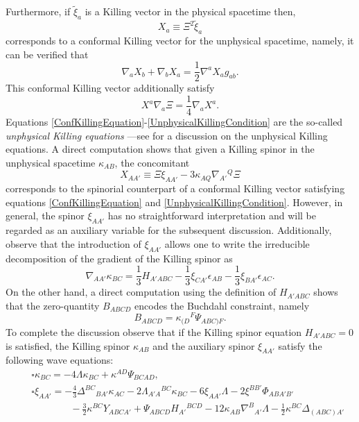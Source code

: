 \documentclass[10pt,a4paper]{article}
\theoremstyle{plain}
\begin{document}
Furthermore, if $\tilde{\xi}_{a}$ is a Killing 
vector in the physical spacetime
  then, 
\begin{equation}
X_{a} \equiv \Xi^2\tilde{\xi}_{a}
\end{equation}
corresponds to a conformal Killing vector for the unphysical
spacetime, namely, it can be verified that
\begin{equation}\label{ConfKillingEquation}
\nabla_{a}X_{b}+ \nabla_{b}X_{a}=\frac{1}{2}\nabla^{a}X_{a}g_{ab}.
\end{equation}
This conformal Killing vector additionally satisfy
\begin{equation}
\label{UnphysicalKillingCondition}
X^{a}\nabla_{a}\Xi=\frac{1}{4}\nabla_{a}X^{a}.
\end{equation}
Equations
\eqref{ConfKillingEquation}-\eqref{UnphysicalKillingCondition} are the
so-called \emph{unphysical Killing equations} ---see \cite{Pae14} for
a discussion on the unphysical Killing equations.  A direct
computation shows that given a Killing spinor in the unphysical
spacetime $\kappa_{AB}$, the concomitant
\begin{equation}
X_{AA'} \equiv \Xi \xi_{AA'}-3 \kappa_{AQ}\nabla_{A'}{}^{Q}\Xi
\end{equation}
corresponds to the spinorial counterpart of a conformal Killing vector
satisfying equations \eqref{ConfKillingEquation} and
\eqref{UnphysicalKillingCondition}.  However, in general, the
spinor $\xi_{AA'}$ has no straightforward interpretation and will be
regarded as an auxiliary variable for the subsequent discussion.
Additionally, observe that the introduction of $\xi_{AA'}$ allows one to
write the irreducible decomposition of the gradient of the Killing
spinor as
\begin{equation}\label{DecompositionDKappaAlt}
\nabla_{AA'}\kappa_{BC}=
\frac{1}{3}H_{A'ABC}-\frac{1}{3}\xi_{CA'}\epsilon_{AB}
-\frac{1}{3}\xi_{BA'}\epsilon_{AC}.
\end{equation}
On the other hand, a direct computation using the definition of
$H_{A'ABC}$ shows that the zero-quantity $B_{ABCD}$ encodes the
Buchdahl constraint, namely
\begin{equation}\label{BuchdahlInTermsOfWeylAndKillingSpinor}
B_{ABCD}= \kappa_{(D}{}^{F}\Psi_{ABC)F}.
\end{equation} 
To complete the discussion observe that if the Killing spinor equation
$H_{A'ABC}=0$ is satisfied, the Killing spinor $\kappa_{AB}$ and the
auxiliary spinor $\xi_{AA'}$ satisfy the following wave equations:
\begin{eqnarray} 
&& \square \kappa_{BC}=-4\Lambda\kappa_{BC} + \kappa^{AD}\Psi_{BCAD} ,
\label{WaveEquationKillingSpinor}\\
&& \square \xi_{AA'}=- \tfrac{4}{3} \Delta^{BC}{}_{BA'} \kappa_{AC} -
2 \Lambda_{A'A}{}^{BC} \kappa_{BC} - 6 \xi_{AA'} \Lambda - 2 \xi^{BB'}
\Phi_{ABA'B'}\nonumber \\ &&\qquad\qquad - \tfrac{3}{2} \kappa^{BC}
Y_{ABCA'} + \Psi_{ABCD} H_{A'}{}^{BCD} - 12 \kappa_{AB}
\nabla^{B}{}_{A'}\Lambda - \tfrac{1}{2} \kappa^{BC} \Delta_{(ABC)A'}
\label{WaveEquationAuxiliaryVariable}
\end{eqnarray}
\end{document}
